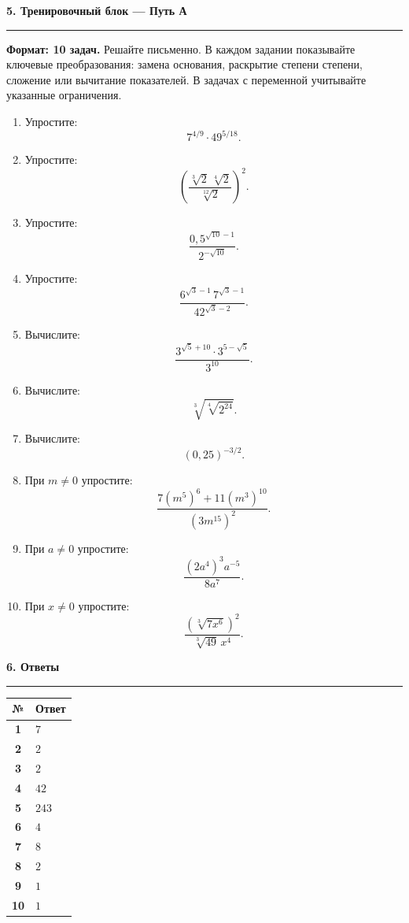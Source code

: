\documentclass[a4paper,12pt]{article}
\newcommand{\sectionline}{\par\vspace{2pt}\noindent\color{rulegray}\rule{\linewidth}{0.5pt}\color{textgray}\par\vspace{5pt}}
\begin{document}
\clearpage

{\LARGE\bfseries\color{darkaccent}5. Тренировочный блок — Путь А}\par
\sectionline

\textbf{Формат: 10 задач.} Решайте письменно. В каждом задании показывайте ключевые преобразования: замена основания, раскрытие степени степени, сложение или вычитание показателей. В задачах с переменной учитывайте указанные ограничения.

\begin{enumerate}
  \item Упростите:
  \[
  7^{4/9}\cdot49^{5/18}.
  \]

  \item Упростите:
  \[
  \left(\frac{\sqrt[3]{2}\,\sqrt[4]{2}}{\sqrt[12]{2}}\right)^2.
  \]

  \item Упростите:
  \[
  \frac{0{,}5^{\sqrt{10}-1}}{2^{-\sqrt{10}}}.
  \]

  \item Упростите:
  \[
  \frac{6^{\sqrt3-1}\,7^{\sqrt3-1}}{42^{\sqrt3-2}}.
  \]

  \item Вычислите:
  \[
  \frac{3^{\sqrt5+10}\cdot3^{5-\sqrt5}}{3^{10}}.
  \]

  \item Вычислите:
  \[
  \sqrt[3]{\sqrt[4]{2^{24}}}.
  \]

  \item Вычислите:
  \[
  (0{,}25)^{-3/2}.
  \]

  \item При $m\ne0$ упростите:
  \[
  \frac{7(m^5)^6+11(m^3)^{10}}{(3m^{15})^2}.
  \]

  \item При $a\ne0$ упростите:
  \[
  \frac{(2a^4)^3a^{-5}}{8a^7}.
  \]

  \item При $x\ne0$ упростите:
  \[
  \frac{\left(\sqrt[3]{7x^6}\right)^2}{\sqrt[3]{49}\,x^4}.
  \]
\end{enumerate}

\clearpage

{\LARGE\bfseries\color{darkaccent}6. Ответы}\par
\sectionline

\renewcommand{\arraystretch}{1.35}
\begin{center}
\begin{tabularx}{0.72\linewidth}{@{}>{\bfseries}c X@{}}
\toprule
№ & Ответ \\
\midrule
1 & $7$ \\
2 & $2$ \\
3 & $2$ \\
4 & $42$ \\
5 & $243$ \\
6 & $4$ \\
7 & $8$ \\
8 & $2$ \\
9 & $1$ \\
10 & $1$ \\
\bottomrule
\end{tabularx}
\end{center}
\end{document}
